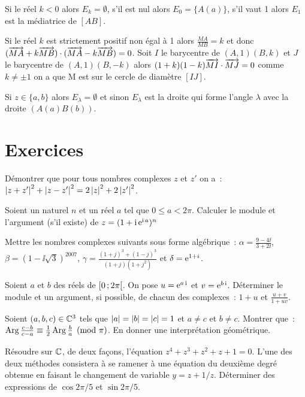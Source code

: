 Si le réel \(k<0\) alors \(E_k=\emptyset\), s'il est nul alors \(E_0=\{A(a)\}\), s'il vaut 1 alors \(E_1\) est la médiatrice de \([AB]\).

Si le réel \(k\) est strictement positif non égal à 1 alors \(\frac{MA}{MB}=k\) et donc \((\overrightarrow{MA}+k\overrightarrow{MB}) \cdot (\overrightarrow{MA}-k\overrightarrow{MB})=0\). Soit \(I\) le barycentre de \((A,1)(B,k)\) et \(J\) le barycentre de \((A,1)(B,-k)\) alors \((1+k)(1-k) \overrightarrow{MI} \cdot \overrightarrow{MJ} =0\) comme \(k \neq \pm 1\) on a que M est sur le cercle de diamètre \([IJ]\).

Si \(z \in \{a,b\}\) alors \(E_\lambda=\emptyset\) et sinon \(E_\lambda\) est la droite qui forme l'angle \(\lambda\) avec la droite \((A(a)B(b))\).
\section{Exercices}
\begin{exercice}
    Démontrer que pour tous nombres complexes \(z\) et \(z'\) on a~:\(\left\lvert z+z'\right\rvert^2 + \left\lvert z-z'\right\rvert^2 = 2\left\lvert z\right\rvert^2 + 2\left\lvert z'\right\rvert^2\).
\end{exercice}
\begin{exercice}
    Soient un naturel \(n\) et un réel \(a\) tel que \(0 \leqslant a < 2\pi\). Calculer le module et l'argument (s'il existe) de \(z = (1+\operatorname{i}\operatorname{e}^{\operatorname{i} a})^n\)
\end{exercice}
\begin{exercice}
    Mettre les nombres complexes suivants sous forme algébrique~: \(\alpha = \frac{9-4\ii}{3+2\ii}\), \(\beta=(1-\ii\sqrt{3})^{2007}\), \(\gamma = \frac{(1+j)^3+(1-j)^3}{(1+j)(1+j^2)}\) et \( \delta = \operatorname{e}^{1+i}\).
\end{exercice}
\begin{exercice}
    Soient \(a\) et \(b\) des réels de \(\left[ 0 \, ;  2\pi \right[\). On pose \(u=\operatorname{e}^{a\operatorname{i}}\) et \(v=\operatorname{e}^{b\operatorname{i}}\). Déterminer le module et un argument, si possible, de chacun des complexes~: \(1+u\) et \(\frac{u+v}{1+uv}\).
\end{exercice}
\begin{exercice}
    Soient \((a, b, c) \in \mathbb{C}^3\) tels que \(\left\lvert a\right\rvert=\left\lvert b\right\rvert=\left\lvert c\right\rvert=1\) et \(a \neq c\) et \(b \neq c\). Montrer que~:\(\operatorname{Arg} \frac{c-b}{c-a} \equiv \frac{1}{2} \operatorname{Arg} \frac{b}{a} \pmod \pi\). En donner une interprétation géométrique.
\end{exercice}
\begin{exercice}
    Résoudre sur \(\mathbb{C}\), de deux façons, l'équation \(z^4+z^3+z^2+z+1=0\). L'une des deux méthodes consistera à se ramener à une équation du deuxième degré obtenue en faisant le changement de variable \(y = z+1/z\). Déterminer des expressions de \(\cos 2\pi/5\) et \(\sin 2\pi/5\).
\end{exercice}
